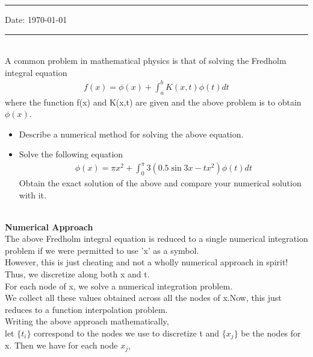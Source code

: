 \documentclass[letterpaper]{exam}
\begin{document}
\hrule
\vspace{3mm}
\noindent 
\vspace{3mm}

\noindent
{{\sf Date: \today }} %



\vspace{3mm}
\hrule
\begin{questions}
\\
A common problem in mathematical physics is that of solving the Fredholm integral equation
\begin{align*}
    f(x) = \phi(x) + \int_{a}^{b} K(x,t)\phi(t)dt
\end{align*}
where the function f(x) and K(x,t) are given and the above problem is to obtain $\phi(x)$.\\
\begin{itemize}
    \item Describe a numerical method for solving the above equation.
    \item Solve the following equation
    \begin{align*}
        \phi(x) = \pi x^2 + \int_{0}^{\pi} 3\left(0.5\sin{3x} - tx^2\right)\phi(t)dt
    \end{align*}
    Obtain the exact solution of the above and compare your numerical solution with it.
\end{itemize}
\begin{solution}
\\
\textbf{Numerical Approach}\\
The above Fredholm integral equation is reduced to a single numerical integration problem if we were permitted to use 'x' as a symbol.\\
However, this is just cheating and not a wholly numerical approach in spirit!\\
Thus, we discretize along both x and t.\\
For each node of x, we solve a numerical integration problem.\\
We collect all these values obtained across all the nodes of x.Now, this just reduces to a function interpolation problem.\\
Writing the above approach mathematically,\\
let $\{t_i\}$ correspond to the nodes we use to discretize t and $\{x_j\}$ be the nodes for x. Then we have for each node $x_j$,
\begin{align*}

\end{align*}
\end{solution}
\end{questions}
\end{document}
